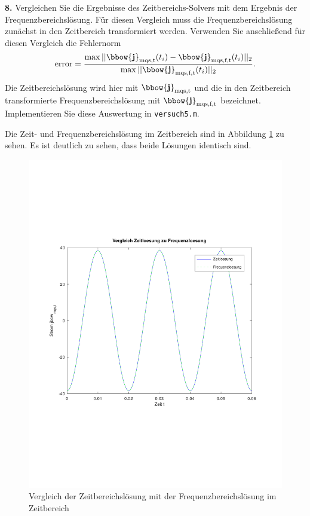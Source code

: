 \documentclass[Protokollheft.tex]{subfiles}
\begin{document}
\begin{framed}
	\noindent \textbf{8.} Vergleichen Sie die Ergebnisse des Zeitbereichs-Solvers mit dem Ergebnis der Frequenzbereichslösung. Für diesen Vergleich muss die Frequenzbereichslösung zunächst in den Zeitbereich transformiert werden. Verwenden Sie anschließend für diesen Vergleich die Fehlernorm
      \begin{equation}
          \text{error} = \frac{\max||\bbow{\mathbf{j}}_\text{mqs,t}(t_i)-\bbow{\mathbf{j}}_\text{mqs,f,t}(t_i)||_2}{\max||\bbow{\mathbf{j}}_\text{mqs,f,t}(t_i)||_2}.
          \label{eq:errorNorm}
      \end{equation}
Die Zeitbereichslösung wird hier mit $\bbow{\mathbf{j}}_\text{mqs,t}$ und die in den Zeitbereich transformierte Frequenzbereichslösung mit $\bbow{\mathbf{j}}_\text{mqs,f,t}$ bezeichnet. Implementieren Sie diese Auswertung in \lstinline{versuch5.m}.\label{exer:compareFreqVStimeInTime}
\end{framed}
\noindent
Die Zeit- und Frequenzbereichslösung im Zeitbereich sind in Abbildung \ref{fig:Zeit_Freq_Vergl} zu sehen. Es ist deutlich zu sehen, dass beide Lösungen identisch sind.
\begin{figure}[h]
	\centering
	\includegraphics[trim = 15mm 65mm 15mm 65mm, clip,width=0.7\linewidth]{Zeit_Freq_Vergl.pdf}
	\caption{Vergleich der Zeitbereichslösung mit der Frequenzbereichslösung im Zeitbereich}
	\label{fig:Zeit_Freq_Vergl}
\end{figure}
\end{document}
